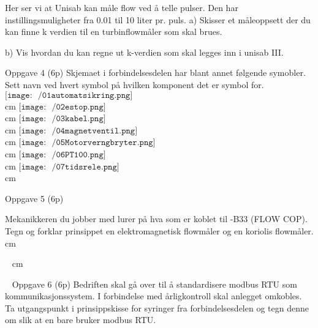 \vskip 15pt 
Her ser vi at Unisab kan måle flow ved  å telle pulser. Den har instillingsmuligheter fra 0.01 til 10 liter pr. puls. 
\vskip 5pt 
a) Skisser et måleoppsett der du kan finne k verdien til en turbinflowmåler som skal brues. 

\vskip 10pt 
b) Vis hvordan du kan regne ut k-verdien som skal legges inn i unisab III. 

\vskip 2.5pt 
\vskip 2.5pt 
\newpage
Oppgave 4 (6p)
\vskip 2.5pt 
Skjemaet i forbindelsesdelen har blant annet følgende symobler. Sett navn ved hvert symbol på hvilken komponent det er symbol for. \\
$\texttt{[image: ~/01automatsikring.png]}$\\
 cm
$\texttt{[image: ~/02estop.png]}$\\
 cm
$\texttt{[image: ~/03kabel.png]}$\\
 cm
$\texttt{[image: ~/04magnetventil.png]}$\\
 cm
$\texttt{[image: ~/05Motorverngbryter.png]}$\\
 cm
$\texttt{[image: ~/06PT100.png]}$\\
 cm
$\texttt{[image: ~/07tidsrele.png]}$\\
 cm
\vskip 2.5pt 
\vskip 2.5pt 
\newpage
Oppgave 5 (6p) %

\vskip 2.5pt 
Mekanikkeren du jobber med lurer på hva som  er koblet til -B33 (FLOW COP). Tegn og forklar prinsippet en elektromagnetisk flowmåler og en koriolis flowmåler. 
 cm 
\vskip 2.5pt 
\vfil \eject
\
 cm 
\vskip 2.5pt 
\vfil \eject
\
\newpage
Oppgave 6 (6p) %
\vskip 2.5pt 
Bedriften skal gå over til å standardisere modbus RTU som kommunikasjonssystem. I forbindelse med årligkontroll skal anlegget omkobles. Ta utgangspunkt i prinsippskisse for syringer fra forbindelsesdelen og tegn denne om slik at en bare bruker modbus RTU.


